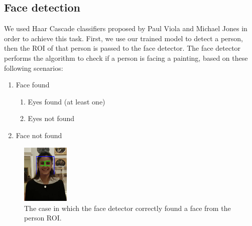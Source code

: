 \subsection{Face detection}
We used Haar Cascade classifiers \cite{haar_cascade} proposed by Paul Viola and Michael Jones in order to achieve this task. First, we use our trained model to detect a person, then the ROI of that person is passed to the face detector. The face detector performs the algorithm to check if a person is facing a painting, based on these following scenarios:
\begin{enumerate}[label=\alph*)]
    \item Face found
    \begin{enumerate}[label=(\roman*)]
        \item \label{Eyes found} Eyes found (at least one)
        \item \label{Eyes not found} Eyes not found
    \end{enumerate}
    \item \label{Face not found} Face not found
\end{enumerate}

\begin{figure}[h!]
    \centering
    \includegraphics[width=0.2\textwidth]{pictures/face_detection/face_det2}
    \caption{The case in which the face detector correctly found a face from the person ROI.}
    \label{fig:Eyes}
\end{figure}

